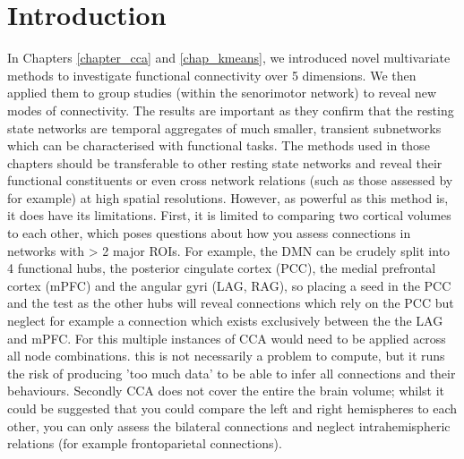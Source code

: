 \section*{Introduction}
In Chapters \ref{chapter_cca} and \ref{chap_kmeans}, we introduced novel multivariate methods to investigate functional connectivity over 5 dimensions. We then applied them to group studies (within the senorimotor network) to reveal new modes of connectivity. The results are important as they confirm that the resting state networks are temporal aggregates of much smaller, transient subnetworks which can be characterised with functional tasks. The methods used in those chapters should be transferable to other resting state networks and reveal their functional constituents or even cross network relations (such as those assessed by \citealp{Fox2005} for example) at high spatial resolutions. However, as powerful as this method is, it does have its limitations. First, it is limited to comparing two cortical volumes to each other, which poses questions about how you assess connections in networks with > 2 major ROIs. For example, the DMN can be crudely split into 4 functional hubs, the posterior cingulate cortex (PCC),  the medial prefrontal cortex (mPFC) and the angular gyri (LAG, RAG), so placing a seed in the PCC and the test as the other hubs will reveal connections which rely on the PCC but neglect for example a connection which exists exclusively between the the LAG and mPFC. For this multiple instances of CCA would need to be applied across all node combinations. this is not necessarily a problem to compute, but it runs the risk of producing 'too much data' to be able to infer all connections and their behaviours. Secondly CCA does not cover the entire the brain volume; whilst it could be suggested that you could compare the left and right hemispheres to each other, you can only assess the bilateral connections and neglect intrahemispheric relations (for example frontoparietal connections).  

